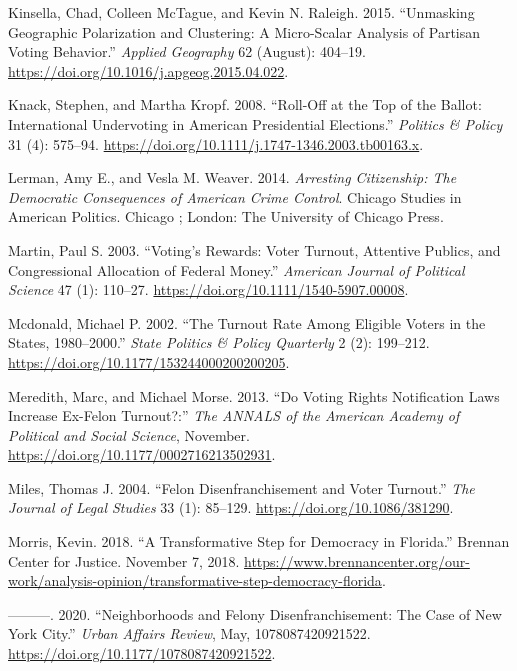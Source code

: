 \documentclass[
  12pt,
]{article}
\newlength{\cslhangindent}
\newenvironment{cslreferences}%
  {\setlength{\parindent}{0pt}%
  \everypar{\setlength{\hangindent}{\cslhangindent}}\ignorespaces}%
  {\par}
\begin{document}
\begin{cslreferences}
\leavevmode\hypertarget{ref-Kinsella2015}{}%
Kinsella, Chad, Colleen McTague, and Kevin N. Raleigh. 2015. ``Unmasking Geographic Polarization and Clustering: A Micro-Scalar Analysis of Partisan Voting Behavior.'' \emph{Applied Geography} 62 (August): 404--19. \url{https://doi.org/10.1016/j.apgeog.2015.04.022}.

\leavevmode\hypertarget{ref-Knack2008}{}%
Knack, Stephen, and Martha Kropf. 2008. ``Roll-Off at the Top of the Ballot: International Undervoting in American Presidential Elections.'' \emph{Politics \& Policy} 31 (4): 575--94. \url{https://doi.org/10.1111/j.1747-1346.2003.tb00163.x}.

\leavevmode\hypertarget{ref-Lerman2014}{}%
Lerman, Amy E., and Vesla M. Weaver. 2014. \emph{Arresting Citizenship: The Democratic Consequences of American Crime Control}. Chicago Studies in American Politics. Chicago ; London: The University of Chicago Press.

\leavevmode\hypertarget{ref-Martin2003}{}%
Martin, Paul S. 2003. ``Voting's Rewards: Voter Turnout, Attentive Publics, and Congressional Allocation of Federal Money.'' \emph{American Journal of Political Science} 47 (1): 110--27. \url{https://doi.org/10.1111/1540-5907.00008}.

\leavevmode\hypertarget{ref-Mcdonald2002}{}%
Mcdonald, Michael P. 2002. ``The Turnout Rate Among Eligible Voters in the States, 1980--2000.'' \emph{State Politics \& Policy Quarterly} 2 (2): 199--212. \url{https://doi.org/10.1177/153244000200200205}.

\leavevmode\hypertarget{ref-Meredith2013}{}%
Meredith, Marc, and Michael Morse. 2013. ``Do Voting Rights Notification Laws Increase Ex-Felon Turnout?:'' \emph{The ANNALS of the American Academy of Political and Social Science}, November. \url{https://doi.org/10.1177/0002716213502931}.

\leavevmode\hypertarget{ref-Miles2004}{}%
Miles, Thomas J. 2004. ``Felon Disenfranchisement and Voter Turnout.'' \emph{The Journal of Legal Studies} 33 (1): 85--129. \url{https://doi.org/10.1086/381290}.

\leavevmode\hypertarget{ref-Morris2018}{}%
Morris, Kevin. 2018. ``A Transformative Step for Democracy in Florida.'' Brennan Center for Justice. November 7, 2018. \url{https://www.brennancenter.org/our-work/analysis-opinion/transformative-step-democracy-florida}.

\leavevmode\hypertarget{ref-Morris2020}{}%
---------. 2020. ``Neighborhoods and Felony Disenfranchisement: The Case of New York City.'' \emph{Urban Affairs Review}, May, 1078087420921522. \url{https://doi.org/10.1177/1078087420921522}.


\end{cslreferences}
\end{document}
